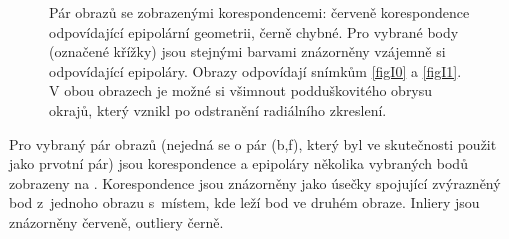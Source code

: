 \documentclass[11pt,oneside,a4paper,pdftex]{article}   %
\begin{document}
			\begin{figure}[htb]
					\centering
				\caption{Pár obrazů se zobrazenými korespondencemi: červeně korespondence odpovídající
					epipolární geometrii, černě chybné. Pro vybrané body (označené křížky) jsou
					stejnými barvami znázorněny vzájemně si odpovídající epipoláry. Obrazy
					odpovídají snímkům \ref{figI0} a \ref{figI1}. V obou obrazech je možné
					si všimnout podduškovitého obrysu okrajů, který vznikl po odstranění
					radiálního zkreslení.}
				\label{figKorespondenceAEpipolary}
			\end{figure}
	
		Pro vybraný pár obrazů (nejedná se o pár (b,f), který byl ve skutečnosti použit jako prvotní pár)
		jsou korespondence a epipoláry ně\-ko\-li\-ka vy\-bra\-ných bodů zobrazeny na
		. Korespondence jsou znázorněny jako úsečky spo\-ju\-jí\-cí
		zvýrazněný bod z~jednoho obrazu s~místem, kde leží bod ve druhém obraze. Inliery jsou znázorněny
		červeně, outliery černě.
		
\end{document}
